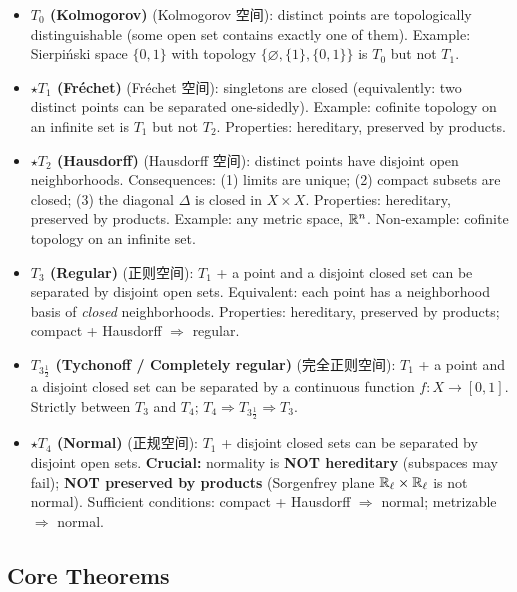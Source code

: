 \documentclass{article}
\newcommand{\starKey}{\textcolor{red!65!black}{\textbf{$\star$}}}
\begin{document}
\begin{itemize}
  \item \textbf{$T_0$ (Kolmogorov)} (Kolmogorov 空间):
  distinct points are topologically distinguishable (some open set contains exactly one of them).
  Example: Sierpi\'nski space $\{0,1\}$ with topology
  $\{\varnothing,\{1\},\{0,1\}\}$ is $T_0$ but not $T_1$.

  \item \starKey \textbf{$T_1$ (Fr\'echet)} (Fr\'echet 空间):
  singletons are closed (equivalently: two distinct points can be separated one-sidedly).
  Example: cofinite topology on an infinite set is $T_1$ but not $T_2$.
  Properties: hereditary, preserved by products.

  \item \starKey \textbf{$T_2$ (Hausdorff)} (Hausdorff 空间):
  distinct points have disjoint open neighborhoods.
  Consequences: (1) limits are unique; (2) compact subsets are closed;
  (3) the diagonal $\Delta$ is closed in $X\times X$.
  Properties: hereditary, preserved by products.
  Example: any metric space, $\mathbb{R}^n$.
  Non-example: cofinite topology on an infinite set.

  \item \textbf{$T_3$ (Regular)} (正则空间):
  $T_1$ + a point and a disjoint closed set can be separated by disjoint open sets.
  Equivalent: each point has a neighborhood basis of \emph{closed} neighborhoods.
  Properties: hereditary, preserved by products; compact + Hausdorff $\Rightarrow$ regular.

  \item \textbf{$T_{3\frac12}$ (Tychonoff / Completely regular)} (完全正则空间):
  $T_1$ + a point and a disjoint closed set can be separated by a continuous function
  $f:X\to[0,1]$.
  Strictly between $T_3$ and $T_4$; $T_4\Rightarrow T_{3\frac12}\Rightarrow T_3$.

  \item \starKey \textbf{$T_4$ (Normal)} (正规空间):
  $T_1$ + disjoint closed sets can be separated by disjoint open sets.
  \textbf{Crucial:} normality is \textbf{NOT hereditary} (subspaces may fail);
  \textbf{NOT preserved by products} (Sorgenfrey plane $\mathbb{R}_\ell\times\mathbb{R}_\ell$ is not normal).
  Sufficient conditions: compact + Hausdorff $\Rightarrow$ normal; metrizable $\Rightarrow$ normal.
\end{itemize}

\subsection{Core Theorems}
\end{document}
